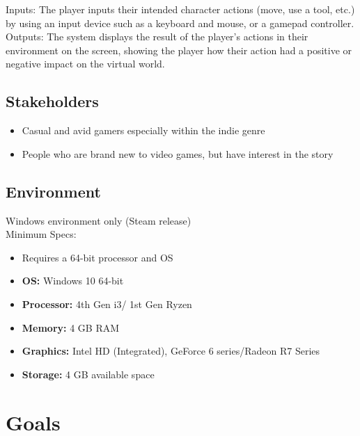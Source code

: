 \documentclass{article}
\begin{document}
Inputs: The player inputs their intended character actions (move, use a tool, etc.) by using an input device such as a keyboard and mouse, or a gamepad controller.\\
Outputs: The system displays the result of the player’s actions in their environment on the screen, showing the player how their action had a positive or negative impact on the virtual world.\\


\subsection{Stakeholders}

\begin{itemize}
\item{Casual and avid gamers especially within the indie genre}
\item{People who are brand new to video games, but have interest in the story}
\end{itemize}

\subsection{Environment}

Windows environment only (Steam release)\\

Minimum Specs:
\begin{itemize}
\item{Requires a 64-bit processor and OS}
\item{\textbf{OS:} Windows 10 64-bit}
\item{\textbf{Processor:} 4th Gen i3/ 1st Gen Ryzen}
\item{\textbf{Memory:} 4 GB RAM}
\item{\textbf{Graphics:} Intel HD (Integrated), GeForce 6 series/Radeon R7 Series}
\item{\textbf{Storage:} 4 GB available space}
\end{itemize}


\section{Goals}
\end{document}
